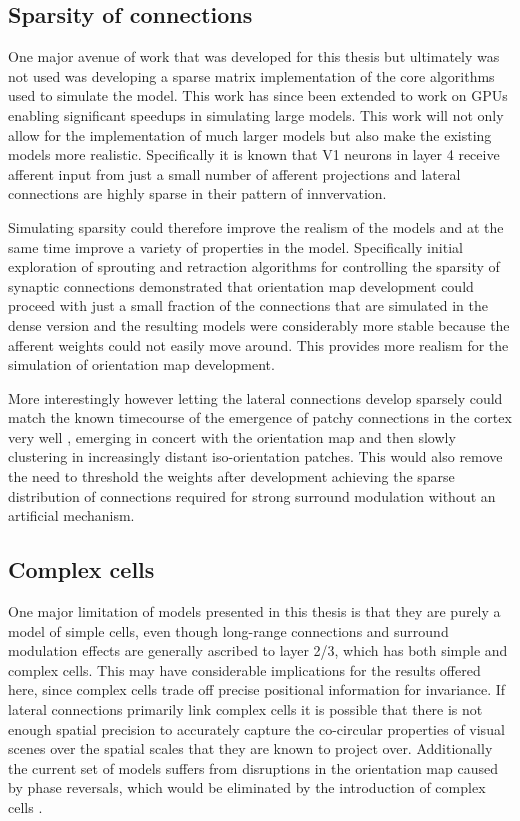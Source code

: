 \subsection{Sparsity of connections}

One major avenue of work that was developed for this thesis but
ultimately was not used was developing a sparse matrix implementation
of the core algorithms used to simulate the model. This work has since
been extended to work on GPUs enabling significant speedups in
simulating large models. This work will not only allow for the
implementation of much larger models but also make the existing models
more realistic. Specifically it is known that V1 neurons in layer 4
receive afferent input from just a small number of afferent
projections and lateral connections are highly sparse in their pattern
of innvervation.

Simulating sparsity could therefore improve the realism of the models
and at the same time improve a variety of properties in the
model. Specifically initial exploration of sprouting and retraction
algorithms for controlling the sparsity of synaptic connections
demonstrated that orientation map development could proceed with just
a small fraction of the connections that are simulated in the dense
version and the resulting models were considerably more stable because
the afferent weights could not easily move around. This provides more
realism for the simulation of orientation map development.

More interestingly however letting the lateral connections develop
sparsely could match the known timecourse of the emergence of patchy
connections in the cortex very well \citep{Ruthazer1996}, emerging in
concert with the orientation map and then slowly clustering in
increasingly distant iso-orientation patches. This would also remove
the need to threshold the weights after development achieving the
sparse distribution of connections required for strong surround
modulation without an artificial mechanism.

\subsection{Complex cells}

One major limitation of models presented in this thesis is that they
are purely a model of simple cells, even though long-range connections
and surround modulation effects are generally ascribed to layer 2/3,
which has both simple and complex cells. This may have considerable
implications for the results offered here, since complex cells trade
off precise positional information for invariance. If lateral
connections primarily link complex cells it is possible that there is
not enough spatial precision to accurately capture the co-circular
properties of visual scenes over the spatial scales that they are
known to project over. Additionally the current set of models suffers
from disruptions in the orientation map caused by phase reversals,
which would be eliminated by the introduction of complex cells
\citep{Antolik2010}.


